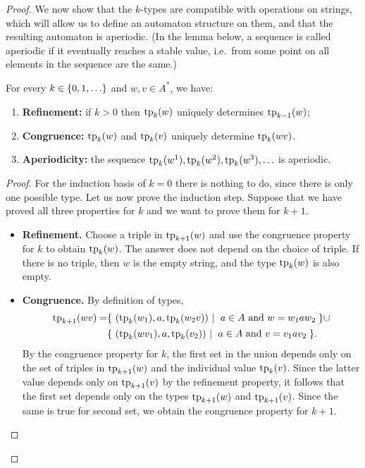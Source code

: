 \begin{proof}
We now show that the $k$-types are compatible with operations on strings, which will allow us to define an automaton structure on them, and that the resulting automaton is aperiodic. (In the lemma below, a sequence is called aperiodic if it eventually reaches a stable value, i.e.~from some point on all elements in the sequence are the same.)

    \begin{lemma}\label{lem:k-types-properties}
        For every $k \in \{0,1,\ldots\}$ and $w, v \in A^*$, we have:
            \begin{enumerate}
        \item \label{item:fo-types-more-information} \textbf{Refinement:} if $k > 0$ then $\text{tp}_k(w)$ uniquely determines  $\text{tp}_{k-1}(w)$;
        \item  \textbf{Congruence:} \label{item:fo-types-congruence} $\text{tp}_k(w)$ and $\text{tp}_k(v)$ uniquely determine  $\text{tp}_k(w v)$.
        \item \textbf{Aperiodicity:} \label{item:fo-types-aperiodic} the sequence $\text{tp}_k(w^1), \text{tp}_k(w^2), \text{tp}_k(w^3), \ldots$ is aperiodic.
    \end{enumerate}
    \end{lemma}
    \begin{proof}
        For the induction basis of $k=0$ there is nothing to do, since there is only one possible type. Let us now prove the induction step. 
        Suppose that we have proved all three properties for $k$ and we want to prove them for $k+1$.
        \begin{itemize}
            \item \textbf{Refinement.} Choose a  triple  in $ \text{tp}_{k+1}(w)$ and use the congruence property for $k$ to obtain  $\text{tp}_{k}(w)$.  The answer does not depend on the choice of triple. If there is no triple, then $w$ is the empty string, and the type $\text{tp}_{k}(w)$ is also empty.
            \item \textbf{Congruence.} By definition of types, 
        \begin{align*}
\fotype_{k+1}(wv) = &      \setbuild{ (\fotype_{k}(w_1), a, \fotype_{k}(w_2v))}{$a \in A$ and $w = w_1 a w_2$}   \cup \\ 
     &    \setbuild{ (\fotype_{k}(wv_1), a, \fotype_{k}(v_2))}{$a \in A$ and $v = v_1 a v_2$}.
        \end{align*}
    By the congruence property for $k$, the first set in the union depends only on the set of triples in $\text{tp}_{k+1}(w)$ and the individual value $\text{tp}_{k}(v)$. Since the latter value depends only on $\text{tp}_{k+1}(v)$ by the refinement property, it follows that the first set depends only on the types $\text{tp}_{k+1}(w)$ and $\text{tp}_{k+1}(v)$. Since the same is true for  second set, we obtain the congruence property for $k+1$.

\end{itemize}
\end{proof}
\end{proof}
